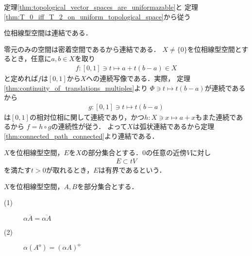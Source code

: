	\begin{sketch}
		定理\ref{thm:topological_vector_spaces_are_uniformazable}と
		定理\ref{thm:T_0_iff_T_2_on_uniform_topological_space}から従う
		\QED
	\end{sketch}
	
	\begin{screen}
		\begin{thm}[位相線型空間の連結性]\label{thm:topological_vector_spaces_connected}
			位相線型空間は連結である．
		\end{thm}
	\end{screen}
	
	\begin{prf}
		零元のみの空間は密着空間であるから連結である．
		$X \neq \{0\}$を位相線型空間とするとき，任意に$a,b \in X$を取り
		\begin{align}
			f:[0,1] \ni t \longmapsto a + t(b - a) \in X
		\end{align}
		と定めれば$f$は$[0,1]$から$X$への連続写像である．実際，
		定理\ref{thm:continuity_of_translations_multiples}より
		$\Phi \ni t \longmapsto t(b-a)$が連続であるから
		\begin{align}
			g:[0,1] \ni t \longmapsto t(b-a)
		\end{align}
		は$[0,1]$の相対位相に関して連続であり，かつ$h:X \ni x \longmapsto a + x$もまた連続であるから
		$f = h \circ g$の連続性が従う．
		よって$X$は弧状連結であるから定理\ref{thm:connected_path_connected}より連結である．
		\QED
	\end{prf}
	
	\begin{screen}
		\begin{dfn}[位相線形空間の有界集合]\label{def:boundedness_in_tvs}
			$X$を位相線型空間，$E$を$X$の部分集合とする．$0$の任意の近傍$V$に対し
			\begin{align}
				E \subset t V
			\end{align}
			を満たす$t > 0$が取れるとき，$E$は有界であるという．
		\end{dfn}
	\end{screen}
	
	\begin{screen}
		\begin{thm}
			$X$を位相線型空間，$A,B$を部分集合とする．
			\begin{description}
				\item[(1)] $\alpha \overline{A} = \overline{\alpha A}$
				\item[(2)] $\alpha (A^{\mathrm{o}}) = (\alpha A)^{\mathrm{o}}$
			\end{description}
		\end{thm}
	\end{screen}
	
